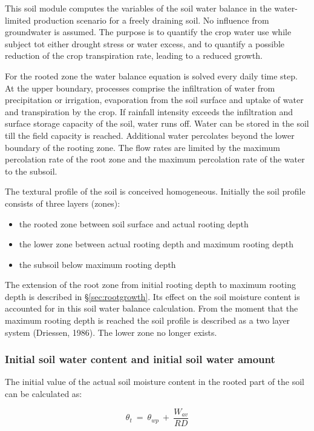 This soil module computes the variables of the soil water balance in the water-limited production scenario for a freely draining soil. No influence from groundwater is assumed. The purpose is to quantify the crop water use while subject tot either drought stress or water excess, and to quantify a possible reduction of the crop transpiration rate, leading to a reduced growth.

For the rooted zone the water balance equation is solved every daily time step. At the upper boundary, processes comprise the infiltration of water from precipitation or irrigation, evaporation from the soil surface and uptake of water and transpiration by the crop. If rainfall intensity exceeds the infiltration and surface storage capacity of the soil, water runs off. Water can be stored in the soil till the field capacity is reached. Additional water percolates beyond the lower boundary of the rooting zone. The flow rates are limited by the maximum percolation rate of the root zone and the maximum percolation rate of the water to the subsoil.

The textural profile of the soil is conceived homogeneous. Initially the soil profile consists of three layers (zones):
\begin{itemize}
	\item the rooted zone between soil surface and actual rooting depth
	\item the lower zone between actual rooting depth and maximum rooting depth
	\item the subsoil below maximum rooting depth
\end{itemize}

The extension of the root zone from initial rooting depth to maximum rooting depth is described in \S \ref{sec:rootgrowth}. Its effect on the soil moisture content is accounted for in this soil water balance calculation. From the moment that the maximum rooting depth is reached the soil profile is described as a two layer system (Driessen, 1986). The lower zone no longer exists.

\subsubsection{Initial soil water content and initial soil water amount}

The initial value of the actual soil moisture content in the rooted part of the soil can be
calculated as:

\begin{equation}
\label{eq:6.18}
\theta_{t} ~ =~\theta_{wp} ~+~{\frac{W_{av}}{RD}}
\end{equation}

